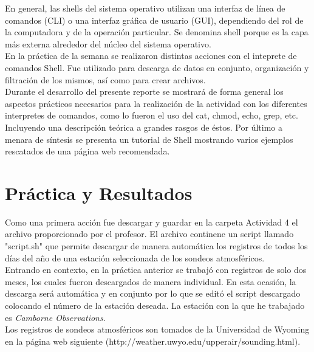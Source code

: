 \documentclass[12pt]{article}
\begin{document}
En general, las shells del sistema operativo utilizan una interfaz de línea de comandos (CLI) o una interfaz gráfica de usuario (GUI), dependiendo del rol de la computadora y de la operación particular. Se denomina shell porque es la capa más externa alrededor del núcleo del sistema operativo.\\

En la práctica de la semana se realizaron distintas acciones con el inteprete de comandos Shell. Fue utilizado para descarga de datos en conjunto, organización y filtración de los mismos, así como para crear archivos. \\

Durante el desarrollo del presente reporte se mostrará de forma general los aspectos prácticos necesarios para la realización de la actividad con los diferentes interpretes de comandos, como lo fueron el uso del cat, chmod, echo, grep, etc. Incluyendo una descripción teórica a grandes rasgos de éstos. Por último a menara de síntesis se presenta un tutorial de Shell mostrando varios ejemplos rescatados de una página web recomendada. 

\section*{Práctica y Resultados}
Como una primera acción fue descargar y guardar en la carpeta Actividad 4 el archivo proporcionado por el profesor. El archivo continene un script llamado "script.sh" que permite descargar de manera automática los registros de todos los días del año de una estación seleccionada de los sondeos atmosféricos. \\

Entrando en contexto, en la práctica anterior se trabajó con registros de solo dos meses, los cuales fueron descargados de manera individual. En esta ocasión, la descarga será automática y en conjunto por lo que se editó el script descargado colocando el número de la estación deseada. La estación con la que he trabajado es \textit{Camborne Observations}.\\

Los registros de sondeos atmosféricos son tomados de la Universidad de Wyoming en la página web siguiente (http://weather.uwyo.edu/upperair/sounding.html).\\
\end{document}
